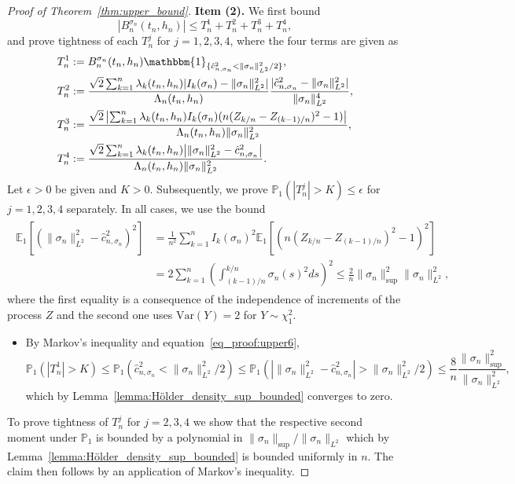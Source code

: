 \documentclass[10.5pt,letter]{article}
\numberwithin{equation}{section}
\theoremstyle{definition}
\newcommand{\E}{\mathbb{E}}
\renewcommand{\P}{\mathbb{P}}
\newcommand{\1}{\mathbbm{1}}
\begin{document}
\begin{proof}[Proof of Theorem~\ref{thm:upper_bound}]
\medskip
\textbf{Item (2).} We first bound
\[ \left| B_n^{\sigma_n}(t_n,h_n)\right| \leq T_n^1 + T_n^2 + T_n^3 + T_n^4,\]
and prove tightness of each $T_n^j$ for $j=1,2,3,4$, where the four terms are given as
\begin{align*}
    T_n^1 &:= B_n^{\sigma_n}(t_n,h_n)\1_{\{ \hat{c}_{n,\sigma_n}^2 < \|\sigma_n\|_{L^2}^2/2\}}, \\
    T_n^2 &:= \frac{\sqrt{2}\sum_{k=1}^n \lambda_k(t_n,h_n)| I_k(\sigma_n) - \|\sigma_n\|_{L^2}^2 |}{\Lambda_n(t_n,h_n)}\frac{|\hat{c}_{n,\sigma_n}^2-\|\sigma_n\|_{L^2}^2|}{\|\sigma_n\|_{L^2}^4},\\
    T_n^3 &:= \frac{\sqrt{2}\left|\sum_{k=1}^n \lambda_k(t_n,h_n) I_k(\sigma_n)(n(Z_{k/n}-Z_{(k-1)/n})^2-1)\right|}{\Lambda_n(t_n,h_n) \|\sigma_n\|_{L^2}^2}, \\
    T_n^4 &:= \frac{\sqrt{2}\sum_{k=1}^n \lambda_k(t_n,h_n) \big| \|\sigma_n\|_{L^2}^2 - \hat{c}_{n,\sigma_n}^2 \big|}{\Lambda_n(t_n,h_n) \|\sigma_n\|_{L^2}^2}.
\end{align*}
Let $\epsilon>0$ be given and $K>0$. Subsequently, we prove $\P_1(|T_n^j|>K)\leq \epsilon$ for $j=1,2,3,4$ separately. In all cases, we use the bound
\begin{align}\label{eq_proof:upper6}
\begin{split}
    \E_1\left[ \left( \|\sigma_{n}\|_{L^2}^2 - \hat{c}_{n,\sigma_n}^2\right)^2\right] &= \frac{1}{n^2} \sum_{k=1}^n I_k(\sigma_n)^2 \E_1\left[ \left(n(Z_{k/n}-Z_{(k-1)/n})^2-1\right)^2\right]  \\
    &= 2\sum_{k=1}^n \left(\int_{(k-1)/n}^{k/n} \sigma_n(s)^2 ds\right)^2\leq \frac2n\|\sigma_n\|_{\sup}^2 \|\sigma_n\|_{L^2}^2,
\end{split}
\end{align}
where the first equality is a consequence of the independence of increments of the process $Z$ and the second one uses $\mathrm{Var}(Y)=2$ for $Y\sim\chi_1^2$.
\begin{itemize}
    \item[$\bullet\ \mathbf{T_n^1.}$] By Markov's inequality and equation~\eqref{eq_proof:upper6},
    \[ \P_1\left(|T_n^1|>K\right) \leq \P_1\left( \hat{c}_{n,\sigma_n}^2 < \|\sigma_n\|_{L^2}^2/2\right) \leq \P_1\left(\left| \|\sigma_{n}\|_{L^2}^2 - \hat{c}_{n,\sigma_n}^2\right| > \|\sigma_n\|_{L^2}^2/2\right) \leq \frac{8}{n}\frac{\|\sigma_n\|_{\sup}^2}{\|\sigma_n\|_{L^2}^2}, \]
    which by Lemma~\ref{lemma:Hölder_density_sup_bounded} converges to zero. 
\end{itemize}
To prove tightness of $T_n^j$ for $j=2,3,4$ we show that the respective second moment under $\P_1$ is bounded by a polynomial in $\|\sigma_n\|_{\sup}/\|\sigma_n\|_{L^2}$ which by Lemma~\ref{lemma:Hölder_density_sup_bounded} is bounded uniformly in $n$. The claim then follows by an application of Markov's inequality.

\end{proof}
\end{document}
